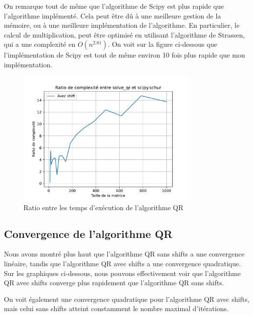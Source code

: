 \documentclass[11pt]{article}
\begin{document}
On remarque tout de même que l'algorithme de Scipy est plus rapide que l'algorithme implémenté. Cela peut être dû à une meilleure gestion de la mémoire, ou à une meilleure implémentation de l'algorithme.
En particulier, le calcul de multiplication, peut être optimisé en utilisant l'algorithme de Strassen, qui a une complexité en $O(n^{2.81})$. 
On voit sur la figure ci-dessous que l'implémentation de Scipy est tout de même environ 10 fois plus rapide que mon implémentation.

\begin{figure}[h]
\centering
\includegraphics[width=0.8\textwidth]{images/compare_solve_qr_complexity_ratio.pdf}
\caption{Ratio entre les temps d'exécution de l'algorithme QR}
\end{figure}

\newpage

\subsection{Convergence de l'algorithme QR}
Nous avons montré plus haut que l'algorithme QR sans shifts a une convergence linéaire, tandis que l'algorithme QR avec shifts a une convergence quadratique.
Sur les graphiques ci-dessous, nous pouvons effectivement voir que l'algorithme QR avec shifts converge plus rapidement que l'algorithme QR sans shifts.

On voit également une convergence quadratique pour l'algorithme QR avec shifts, mais celui sans shifts atteint constamment le nombre maximal d'itérations.
\end{document}
